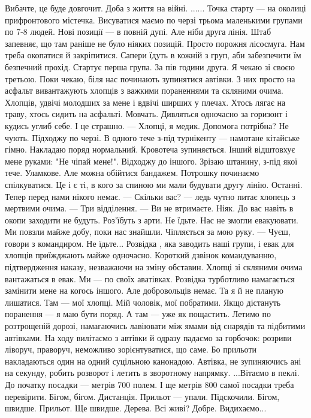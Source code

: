 Вибачте, це буде довгочит. Доба з  життя на війні.
......
Точка  старту  —   на околиці прифронтового  містечка.  Висуватися маємо  по черзі трьома маленькими групами по  7-8 людей. Нові позиції —  в повній  дупі. Але ніби друга лінія.  
Штаб запевняє,  що там раніше не було ніяких позицій. Просто порожня лісосмуга.  Нам треба окопатися й закріпитися. Сапери їдуть в кожній з груп, аби забезпечити їм безпечний прохід. 
Стартує перша  група. За пів години  друга. Я чекаю зі своєю третьою.  Поки чекаю, біля нас починають зупинятися  автівки. З них просто на асфальт вивантажують хлопців з важкими пораненнями та скляними очима. Хлопців, удвічі молодших за мене і вдвічі ширших у плечах. Хтось лягає на траву, хтось сидить на асфальті.  Мовчать. Дивляться одночасно за горизонт і кудись углиб себе. І це страшно. 
— Хлопці, я медик. Допомога потрібна?
Не чують. Підходжу по черзі.  В одного тече з-під турнікенту — намотане кітайське гімно. Накладаю поряд нормальний. Кровотеча зупиняється. Інший відштовхує мене руками: "Не чіпай мене!". Відходжу до іншого. Зрізаю штанину, з-під якої тече. Уламкове. Але можна обійтися бандажем.  
Потрошку починаємо спілкуватися. Це і є ті, в кого за спиною ми мали будувати  другу лінію. Останні. Тепер перед нами нікого немає. 
— Скільки вас? — ледь чутно питає  хлопець  з мертвими очима.
— Три відділення.
— Ви не втримаєте. Ніяк. До вас навіть в окопи заходити  не будуть. Роз'їбуть з арти. Не їдьте. Нас не змогли евакуювати. Ми повзли майже добу, поки нас знайшли. 
Чіпляється за мою руку. 
— Чуєш,  говори з командиром. Не їдьте...
Розвідка , яка заводить наші групи, і евак для хлопців приїжджають майже одночасно. Короткий дзвінок командуванню, підтвердження наказу, незважаючи на зміну обставин.  Хлопці зі скляними  очима вантажаться в евак. Ми — по своїх аватівках. Розвідка  турботливо  намагається замінити мене на когось іншого.  Але добровольців  немає. Та я й не планую лишатися. Там — мої хлопці.  Мій чоловік, мої побратими. Якщо дістануть поранення — я маю бути поряд. А там —  уже  як пощастить. 
Летимо  по розтрощеній  дорозі, намагаючись  лавіювати між ямами від снарядів та підбитими  автівками. На ходу вилітаємо з автівки й одразу падаємо за горбочок: розриви ліворуч, праворуч, неможливо зорієнтуватися, що саме. Бо прильоти накладаються один на одний суцільною канонадою. Автівка, не зупиняючись ані на секунду, робить розворот і  летить в зворотному напрямку.  
...Вітаємо в пеклі. 
До початку посадки — метрів 700 полем. І ще метрів 800 самої посадки треба перевірити. Бігом, бігом. Дистанція.  Прильот — упали. Підскочили. Бігом, швидше. Прильот. Ще швидше. Дерева. Всі  живі? Добре. Видихаємо...
